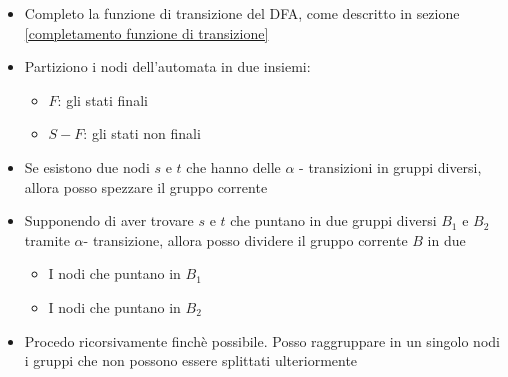 \begin{itemize}
	\item Completo la funzione di transizione del DFA, come descritto in sezione \ref{completamento funzione di transizione}
	\item Partiziono i nodi dell'automata in due insiemi:
	      \begin{itemize}
		      \item $ F $: gli stati finali
		      \item $ S - F $: gli stati non finali
	      \end{itemize}
	\item Se esistono due nodi $ s $ e $ t $ che hanno delle $ \alpha  $ - transizioni in gruppi diversi, allora posso spezzare il gruppo corrente
	\item Supponendo di aver trovare $ s $ e $ t $ che puntano in due gruppi diversi $ B_1 $ e $ B_2 $ tramite $ \alpha $- transizione, allora posso dividere il gruppo corrente $ B $ in due
	      \begin{itemize}
		      \item I nodi che puntano in $ B_1 $
		      \item I nodi che puntano in $ B_2 $
	      \end{itemize}
	\item Procedo ricorsivamente finchè possibile. Posso raggruppare in un singolo nodi i gruppi che non possono essere splittati ulteriormente
\end{itemize}
